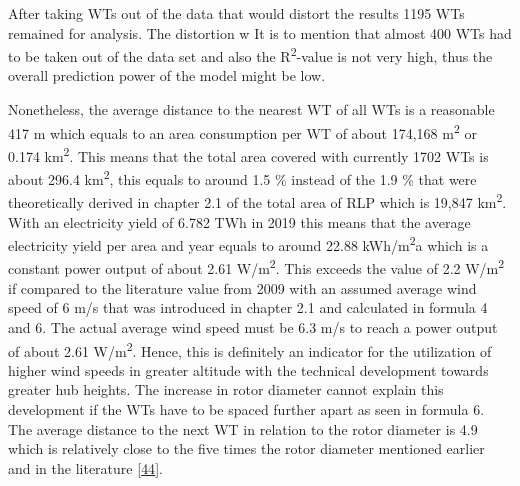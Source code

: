 \documentclass[a4paper,11pt]{article}
\begin{document}
After taking WTs out of the data that would distort the results 1195 WTs remained for analysis. The distortion w It is to mention that almost 400 WTs had to be taken out of the data set and also the R\textsuperscript{2}-value is not very high, thus the overall prediction power of the model might be low.

Nonetheless, the average distance to the nearest WT of all WTs is a reasonable 417 m which equals to an area consumption per WT of about 174,168 m\textsuperscript{2} or 0.174 km\textsuperscript{2}. This means that the total area covered with currently 1702 WTs is about 296.4 km\textsuperscript{2}, this equals to around 1.5 \% instead of the 1.9 \% that were theoretically derived in chapter 2.1 of the total area of RLP which is 19,847 km\textsuperscript{2}. With an electricity yield of 6.782 TWh in 2019 this means that the average electricity yield per area and year equals to around 22.88 kWh/m\textsuperscript{2}a which is a constant power output of about 2.61 W/m\textsuperscript{2}. This exceeds the value of 2.2 W/m\textsuperscript{2} if compared to the literature value from 2009 with an assumed average wind speed of 6 m/s that was introduced in chapter 2.1 and calculated in formula 4 and 6. The actual average wind speed must be 6.3 m/s to reach a power output of about 2.61 W/m\textsuperscript{2}. Hence, this is definitely an indicator for the utilization of higher wind speeds in greater altitude with the technical development towards greater hub heights. The increase in rotor diameter cannot explain this development if the WTs have to be spaced further apart as seen in formula 6. The average distance to the next WT in relation to the rotor diameter is 4.9 which is relatively close to the five times the rotor diameter mentioned earlier and in the literature {[}\protect\hyperlink{ref-DavidJCMacKay.2009}{44}{]}.
\end{document}
